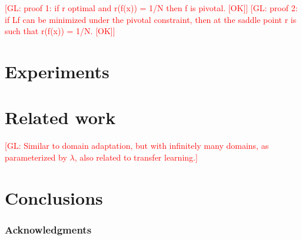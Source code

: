 \documentclass{article}
\newcommand{\glnote}[1]{\textcolor{red}{[GL: #1]}}
\theoremstyle{plain}
\begin{document}
\glnote{proof 1: if r optimal and r(f(x)) = 1/N then f is pivotal. [OK]}
\glnote{proof 2: if Lf can be minimized under the pivotal constraint, then at the saddle point r is such that r(f(x)) = 1/N. [OK]}

\section{Experiments}

\section{Related work}

\glnote{Similar to domain adaptation, but with infinitely many domains,
as parameterized by $\lambda$, also related to transfer learning.}

\section{Conclusions}

\subsubsection*{Acknowledgments}


{\small
}
\end{document}
